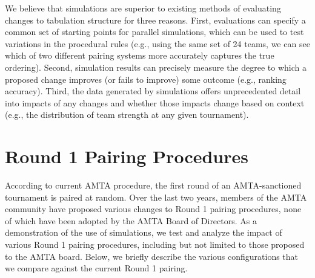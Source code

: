 \documentclass{tufte-handout}
\begin{document}
We believe that simulations are superior to existing methods of evaluating changes to tabulation structure for three reasons. First, evaluations can specify a common set of starting points for parallel simulations, which can be used to test variations in the procedural rules (e.g., using the same set of 24 teams, we can see which of two different pairing systems more accurately captures the true ordering). Second, simulation results can precisely measure the degree to which a proposed change improves (or fails to improve) some outcome (e.g., ranking accuracy). Third, the data generated by simulations offers unprecedented detail into impacts of any changes and whether those impacts change based on context (e.g., the distribution of team strength at any given tournament). 

\section{Round 1 Pairing Procedures}

According to current AMTA procedure, the first round of an AMTA-sanctioned tournament is paired at random. Over the last two years, members of the AMTA community have proposed various changes to Round 1 pairing procedures, none of which have been adopted by the AMTA Board of Directors. As a demonstration of the use of simulations, we test and analyze the impact of various Round 1 pairing procedures, including but not limited to those proposed to the AMTA board. Below, we briefly describe the various configurations that we compare against the current Round 1 pairing.
\end{document}
